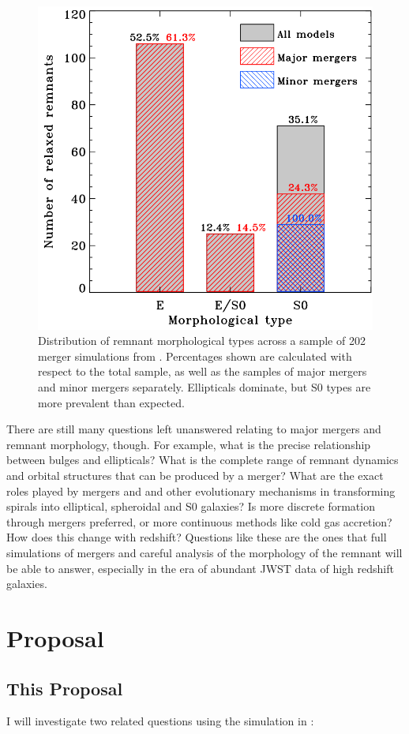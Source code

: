 \documentclass[linenumbers]{aastex631}
\begin{document}
\begin{figure}
    \centering
    \includegraphics[width=0.5\linewidth]{morphs.png}
    \caption{
        Distribution of remnant morphological types across a sample of 202 merger simulations from \cite{Eliche-Moral+2018}.
        Percentages shown are calculated with respect to the total sample, as well as the samples of major mergers and minor mergers separately.
        Ellipticals dominate, but S0 types are more prevalent than expected.
        }
    \label{fig:morphs}
\end{figure}
    
There are still many questions left unanswered relating to major mergers and remnant morphology, though. 
For example, what is the precise relationship between bulges and ellipticals? 
What is the complete range of remnant dynamics and orbital structures that can be produced by a merger?
What are the exact roles played by mergers and and other evolutionary mechanisms in transforming spirals into elliptical, spheroidal and S0 galaxies?
Is more discrete formation through mergers preferred, or more continuous methods like cold gas accretion?
How does this change with redshift?
Questions like these are the ones that full simulations of mergers and careful analysis of the morphology of the remnant will be able to answer, especially in the era of abundant JWST data of high redshift galaxies.


\section{Proposal}

\subsection{This Proposal}

I will investigate two related questions using the simulation in \cite{van_der_Marel-2012}:
\end{document}
